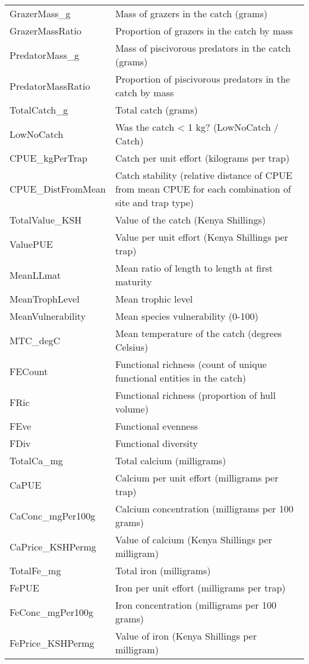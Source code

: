 \documentclass[
]{article}
\begin{document}
\begin{longtable}[]{@{}
  >{\raggedright\arraybackslash}p{}
  >{\raggedright\arraybackslash}p{}@{}}
GrazerMass\_g & Mass of grazers in the catch (grams) \\
GrazerMassRatio & Proportion of grazers in the catch by mass \\
PredatorMass\_g & Mass of piscivorous predators in the catch (grams) \\
PredatorMassRatio & Proportion of piscivorous predators in the catch by
mass \\
TotalCatch\_g & Total catch (grams) \\
LowNoCatch & Was the catch \textless{} 1 kg? (LowNoCatch / Catch) \\
CPUE\_kgPerTrap & Catch per unit effort (kilograms per trap) \\
CPUE\_DistFromMean & Catch stability (relative distance of CPUE from
mean CPUE for each combination of site and trap type) \\
TotalValue\_KSH & Value of the catch (Kenya Shillings) \\
ValuePUE & Value per unit effort (Kenya Shillings per trap) \\
MeanLLmat & Mean ratio of length to length at first maturity \\
MeanTrophLevel & Mean trophic level \\
MeanVulnerability & Mean species vulnerability (0-100) \\
MTC\_degC & Mean temperature of the catch (degrees Celsius) \\
FECount & Functional richness (count of unique functional entities in
the catch) \\
FRic & Functional richness (proportion of hull volume) \\
FEve & Functional evenness \\
FDiv & Functional diversity \\
TotalCa\_mg & Total calcium (milligrams) \\
CaPUE & Calcium per unit effort (milligrams per trap) \\
CaConc\_mgPer100g & Calcium concentration (milligrams per 100 grams) \\
CaPrice\_KSHPermg & Value of calcium (Kenya Shillings per milligram) \\
TotalFe\_mg & Total iron (milligrams) \\
FePUE & Iron per unit effort (milligrams per trap) \\
FeConc\_mgPer100g & Iron concentration (milligrams per 100 grams) \\
FePrice\_KSHPermg & Value of iron (Kenya Shillings per milligram) \\

\end{longtable}
\end{document}

